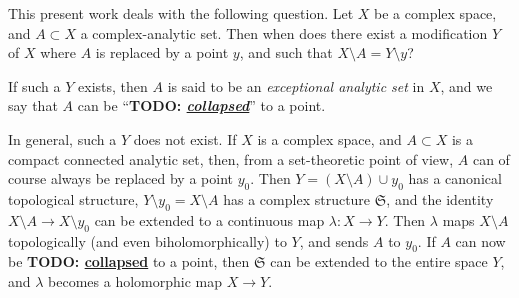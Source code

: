 \documentclass{article}
\theoremstyle{plain}
\theoremstyle{definition}
\newcommand{\fk}{\mathfrak}
\newcommand{\unsure}[1]{\textbf{TODO: \underline{#1}}}
\begin{document}
This present work deals with the following question.
Let $X$ be a complex space, and $A\subset X$ a complex-analytic set.
Then when does there exist a modification $Y$ of $X$ where $A$ is replaced by a point $y$, and such that $X\setminus A=Y\setminus y$?

If such a $Y$ exists, then $A$ is said to be an \emph{exceptional analytic set} in $X$, and we say that $A$ can be ``\unsure{\emph{collapsed}}'' to a point.

In general, such a $Y$ does not exist.
If $X$ is a complex space, and $A\subset X$ is a compact connected analytic set, then, from a set-theoretic point of view, $A$ can of course always be replaced by a point $y_0$.
Then $Y=(X\setminus A)\cup y_0$ has a canonical topological structure, $Y\setminus y_0=X\setminus A$ has a complex structure $\fk{S}$, and the identity $X\setminus A\to X\setminus y_0$ can be extended to a continuous map $\lambda\colon X\to Y$.
Then $\lambda$ maps $X\setminus A$ topologically (and even biholomorphically) to $Y$, and sends $A$ to $y_0$.
If $A$ can now be \unsure{collapsed} to a point, then $\fk{S}$ can be extended to the entire space $Y$, and $\lambda$ becomes a holomorphic map $X\to Y$.
\end{document}
